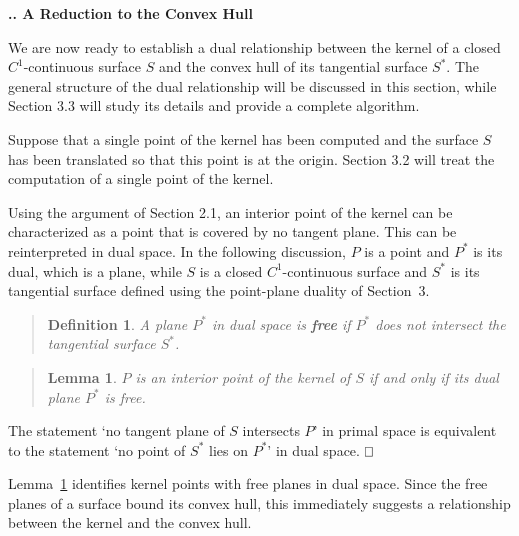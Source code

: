 \documentclass[twoside]{article}
\newtheorem{definitionenv}{Definition}
\newenvironment{defn2}{\begin{quote}\begin{definitionenv}}%
                           {\end{definitionenv}\end{quote}}
\newtheorem{lemmaenv}{Lemma}
\newenvironment{lemma}{\begin{quote}\begin{lemmaenv}}%
                           {\end{lemmaenv}\end{quote}}
\newcommand{\prf}{\noindent{{\bf Proof}:\ \ \ }}
\newcounter{sectionc}\newcounter{subsectionc}\newcounter{subsubsectionc}
\renewcommand{\subsection}[1] {\vspace{12pt}\addtocounter{subsectionc}{1} 
	\setcounter{subsubsectionc}{0}\noindent 
	{\bf\thesectionc.\thesubsectionc. {\kern1pt \bfit #1}}\par\vspace{5pt}}
\def\qed{\hbox{${\vcenter{\vbox{			%
   \hrule height 0.4pt\hbox{\vrule width 0.4pt height 6pt
   \kern5pt\vrule width 0.4pt}\hrule height 0.4pt}}}$}}
\begin{document}
\subsection{A Reduction to the Convex Hull}
\label{sec:reduction}
\noindent
We are now ready to establish a dual relationship between the kernel of 
a closed $C^1$-continuous surface $S$ and the convex hull of
its tangential surface $S^*$.
The general structure of the dual relationship will be discussed in this section,
while Section 3.3 will study its details and provide a complete algorithm.

Suppose that a single point of the kernel has been computed and the surface $S$
has been translated so that this point is at the origin.
Section 3.2 will treat the computation of a single point of the kernel.

Using the argument of Section 2.1,
an interior point of the kernel can be characterized as a point that is covered by
no tangent plane.
This can be reinterpreted in dual space.
In the following discussion, $P$ is a point and $P^*$ is its dual, 
which is a plane, while $S$ is a closed $C^1$-continuous surface 
and $S^*$ is its tangential surface defined using the point-plane
duality of Section~3.

\begin{defn2}
A plane $P^*$ in dual space is {\bf free} if $P^*$ does not intersect the tangential surface $S^*$.
\end{defn2}

\begin{lemma}
\label{lem:dualkernelchar}
$P$ is an interior point of the kernel of $S$ if and only if 
its dual plane $P^*$ is free.
\end{lemma}
\prf
The statement `no tangent plane of $S$ intersects $P$' in primal space
is equivalent to the statement `no point of $S^*$ lies on $P^*$' in dual space.
\qed\,

\smallskip

Lemma~\ref{lem:dualkernelchar} identifies kernel points
with free planes in dual space.
Since the free planes of a surface bound its convex hull,
this immediately suggests a relationship between the kernel and the convex hull.
\end{document}
